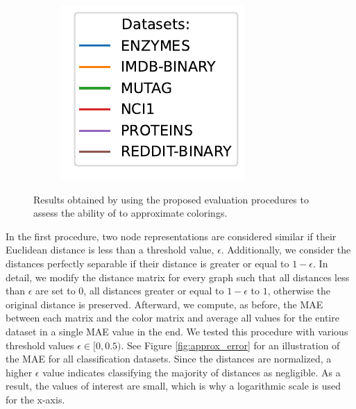 \begin{figure}[!htb]
\begin{subfigure}[t]{0.2\textwidth}
{			\includegraphics[width=\textwidth]{Figures/global_error_legend.pdf}
		}
	\end{subfigure}
	\caption{Results obtained by using the proposed evaluation procedures to assess the ability of \gnns to approximate \wl colorings.}
	\label{fig:approx_eval}
\end{figure}

In the first procedure, two node representations are considered similar if their Euclidean distance is less than a threshold value, $\epsilon$. Additionally, we consider the distances perfectly separable if their distance is greater or equal to $1 - \epsilon$. In detail, we modify the \gnn distance matrix for every graph such that all distances less than $\epsilon$ are set to $0$, all distances greater or equal to $1 - \epsilon$ to $1$, otherwise the original distance is preserved. Afterward, we compute, as before, the MAE between each \gnn matrix and the \wl color matrix and average all values for the entire dataset in a single MAE value in the end. We tested this procedure with various threshold values $\epsilon \in [0, 0.5)$. See Figure \ref{fig:approx_error} for an illustration of the MAE for all classification datasets. Since the distances are normalized, a higher $\epsilon$ value indicates classifying the majority of distances as negligible. As a result, the values of interest are small, which is why a logarithmic scale is used for the x-axis.

